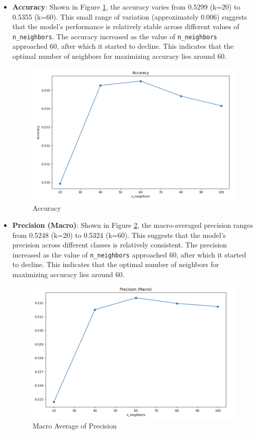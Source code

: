 \documentclass[times, twocolumn]{article}
\begin{document}
\begin{itemize}
    \item \textbf{Accuracy}: Shown in Figure \ref{fig:accuracy}, the accuracy varies from 0.5299 (k=20) to 0.5355 (k=60). This small range of variation (approximately 0.006) suggests that the model's performance is relatively stable across different values of \verb|n_neighbors|. The accuracy increased as the value of \verb|n_neighbors| approached 60, after which it started to decline. This indicates that the optimal number of neighbors for maximizing accuracy lies around 60.
    \begin{figure}[H]
        \centering
        \includegraphics[width=1.0\linewidth]{KNN_Accuracy.png}
        \caption{Accuracy}
        \label{fig:accuracy}
    \end{figure}
    
    \item \textbf{Precision (Macro)}: Shown in Figure \ref{fig:precision}, the macro-averaged precision ranges from 0.5248 (k=20) to 0.5324 (k=60). This suggests that the model's precision across different classes is relatively consistent. The precision increased as the value of \verb|n_neighbors| approached 60, after which it started to decline. This indicates that the optimal number of neighbors for maximizing accuracy lies around 60.
    \begin{figure}[H]
        \centering
        \includegraphics[width=1.0\linewidth]{KNN_precision_macro.png}
        \caption{Macro Average of Precision}
        \label{fig:precision}
    \end{figure}


\end{itemize}
\end{document}
